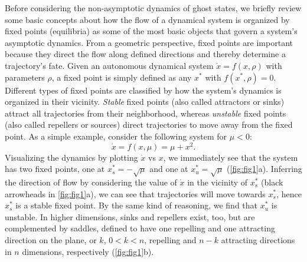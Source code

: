 \documentclass{article}
\theoremstyle{definition}
\begin{document}
\begin{refsection}
Before considering the non-asymptotic dynamics of ghost states, we briefly review some basic concepts about how the flow of a dynamical system is organized by fixed points (equilibria) as some of the most basic objects that govern a system's asymptotic dynamics. From a geometric perspective, fixed points are important because they direct the flow along defined directions and thereby determine a trajectory's fate. Given an autonomous dynamical system $\dot{x} = f(x,\rho)$ with parameters $\rho$, a fixed point is simply defined as any $x^*$ with $f(x^*,\rho)=0$. Different types of fixed points are classified by how the system's dynamics is organized in their vicinity. \textit{Stable} fixed points (also called attractors or sinks) attract all trajectories from their neighborhood, whereas \textit{unstable} fixed points (also called repellers or sources) direct trajectories to move away from the fixed point. As a simple example, consider the following system for $\mu <0$:
\begin{equation}
\dot{x} = f(x,\mu)=\mu + x^2. \label{eq:1}
\end{equation}
Visualizing the dynamics by plotting $\dot{x}$ vs $x$, we immediately see that the system has two fixed points, one at $x_s^* = -\sqrt{\mu}$ and one at $x_u^* = \sqrt{\mu}$ (\autoref{fig:fig1}a). Inferring the direction of flow by considering the value of $\dot{x}$ in the vicinity of $x_s^*$ (black arrowheads in \autoref{fig:fig1}a), we can see that trajectories will move towards $x_s^*$, hence $x_s^*$ is a stable fixed point. By the same kind of reasoning, we find that $x_u^*$ is unstable. In higher dimensions, sinks and repellers exist, too, but are complemented by saddles, defined to have one repelling and one attracting direction on the plane, or $k$, $0<k<n$, repelling and $n-k$ attracting directions in $n$ dimensions, respectively (\autoref{fig:fig1}b).


\end{refsection}
\end{document}
